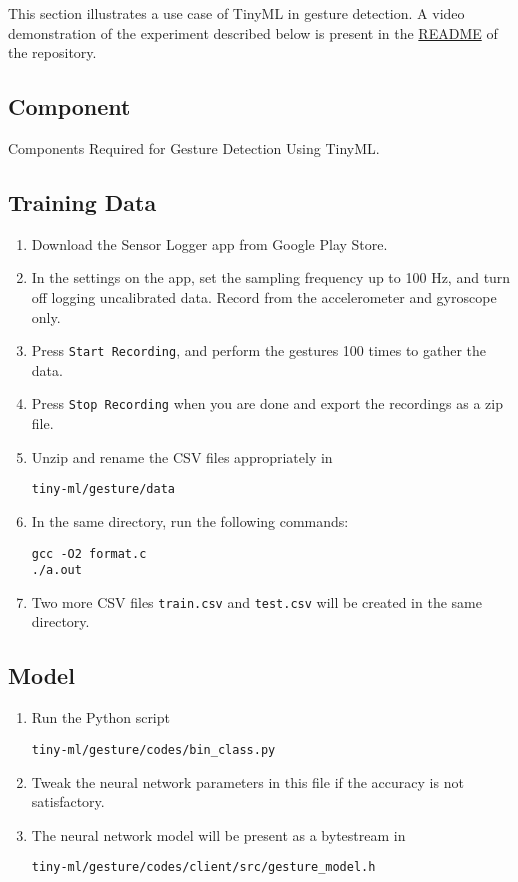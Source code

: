 This section illustrates a use case of TinyML in gesture detection. A video
demonstration of the experiment described below is present in the 
\href{https://github.com/gadepall/aiml#TinyML}{README} of the repository.

\subsection{Component}
\begin{table}[!ht]
    \centering
    
    \caption{Components Required for Gesture Detection Using TinyML.}
    \label{tab:gesture-components}
\end{table}

\subsection{Training Data}
\begin{enumerate}
    \item Download the Sensor Logger app from Google Play Store.
    \item In the settings on the app, set the sampling frequency up to 100 Hz, 
    and turn off logging uncalibrated data. Record from the accelerometer and
    gyroscope only.
    \item Press \texttt{Start Recording}, and perform the gestures 100 times
    to gather the data.
    \item Press \texttt{Stop Recording} when you are done and export the 
    recordings as a zip file.
    \item Unzip and rename the CSV files appropriately in
    \begin{lstlisting}
tiny-ml/gesture/data
    \end{lstlisting}
    \item In the same directory, run the following commands:
    \begin{lstlisting}
gcc -O2 format.c
./a.out
    \end{lstlisting}
    \item Two more CSV files \texttt{train.csv} and \texttt{test.csv} will be 
    created in the same directory.
\end{enumerate}

\subsection{Model}
\begin{enumerate}
    \item Run the Python script
    \begin{lstlisting}
tiny-ml/gesture/codes/bin_class.py
    \end{lstlisting}
    \item Tweak the neural network parameters in this file if the accuracy is
    not satisfactory.
    \item The neural network model will be present as a bytestream in
    \begin{lstlisting}
tiny-ml/gesture/codes/client/src/gesture_model.h  
    \end{lstlisting}
\end{enumerate}

